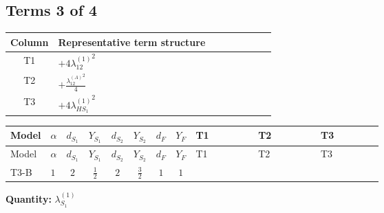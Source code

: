 \documentclass[8pt]{article}
\begin{document}
\begin{landscape}
\subsection*{Terms 3 of 4}
\begin{center}
\begin{tabular}{@{}c >{\raggedright\arraybackslash}p{0.82\linewidth}@{}}
\toprule
Column & Representative term structure \\
\midrule
T1 & \(\displaystyle +4 {\lambda_{12}^{(1)}}^2\) \\
\midrule
T2 & \(\displaystyle +\frac{{\lambda_{12}^{(A)}}^2}{4}\) \\
\midrule
T3 & \(\displaystyle +4 {\lambda_{HS_1}^{(1)}}^2\) \\
\midrule
\bottomrule
\end{tabular}
\end{center}
\smallskip
\tiny
\begin{longtable}{@{}llcccccc >{\raggedright\arraybackslash}p{0.21\linewidth} >{\raggedright\arraybackslash}p{0.21\linewidth} >{\raggedright\arraybackslash}p{0.21\linewidth}@{}}
\toprule
Model & $\alpha$ & $d_{S_1}$ & $Y_{S_1}$ & $d_{S_2}$ & $Y_{S_2}$ & $d_F$ & $Y_F$ & T1 & T2 & T3 \\
\midrule
\endfirsthead
\toprule
Model & $\alpha$ & $d_{S_1}$ & $Y_{S_1}$ & $d_{S_2}$ & $Y_{S_2}$ & $d_F$ & $Y_F$ & T1 & T2 & T3 \\
\midrule
\endhead
T3-B & $1$ & $2$ & $\frac{1}{2}$ & $2$ & $\frac{3}{2}$ & $1$ & $1$ & \scriptsize\adjustbox{max width=\linewidth}{$\begin{gathered} +4 {\lambda_{12}^{(1)}}^2\end{gathered}$} & \scriptsize\adjustbox{max width=\linewidth}{$\begin{gathered} +\frac{{\lambda_{12}^{(A)}}^2}{4}\end{gathered}$} & \scriptsize\adjustbox{max width=\linewidth}{$\begin{gathered} +4 {\lambda_{HS_1}^{(1)}}^2\end{gathered}$} \\
\midrule
\bottomrule
\end{longtable}
\clearpage
\noindent\textbf{Quantity: }$\lambda_{S_1}^{(1)}$\par\smallskip

\end{landscape}
\end{document}
